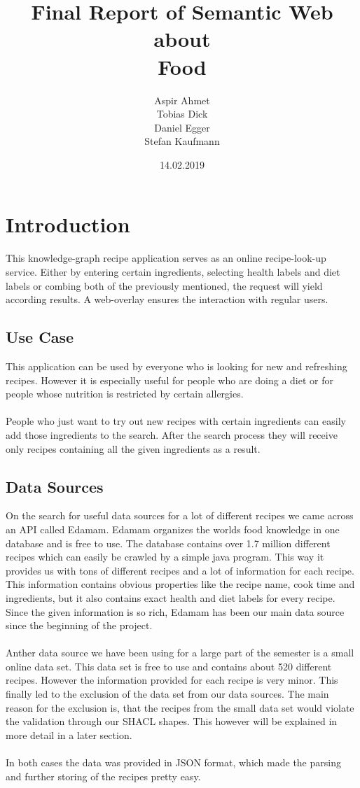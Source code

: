 \documentclass{article}
\title{ Final Report of Semantic Web about \\ \Huge \textbf{Food}}
\author{Aspir Ahmet \\ Tobias Dick \\ Daniel Egger \\Stefan Kaufmann}
\date{14.02.2019}
\begin{document}
\thispagestyle{empty}
\clearpage
\maketitle
\thispagestyle{empty}
\thispagestyle{empty}
\newpage
\clearpage
\tableofcontents 
\thispagestyle{empty}
\newpage
\pagebreak
{}
	
\section{Introduction}
This knowledge-graph recipe application serves as an online recipe-look-up service. Either by entering certain ingredients, selecting health labels and diet labels or combing both of the previously mentioned, the request will yield according results. A web-overlay ensures the interaction with regular users. 
\subsection{Use Case}
This application can be used by everyone who is looking for new and refreshing recipes. However it is especially useful for people who are doing a diet or for people whose nutrition is restricted by certain allergies. \\ \\
People who just want to try out new recipes with certain ingredients can easily add those ingredients to the search. After the search process they will receive only recipes containing all the given ingredients as a result.

\subsection{Data Sources}
On the search for useful data sources for a lot of different recipes we came across an API called Edamam. Edamam organizes the worlds food knowledge in one database and is free to use. The database contains over 1.7 million different recipes which can easily be crawled by a simple java program. This way it provides us with tons of different recipes and a lot of information for each recipe. This information contains obvious properties like the recipe name, cook time and ingredients, but it also contains exact health and diet labels for every recipe. Since the given information is so rich, Edamam has been our main data source since the beginning of the project. \\ \\
Anther data source we have been using for a large part of the semester is a small online data set. This data set is free to use and contains about 520 different recipes. However the information provided for each recipe is very minor. This finally led to the exclusion of the data set from our data sources. The main reason for the exclusion is, that the recipes from the small data set would violate the validation through our SHACL shapes. This however will be explained in more detail in a later section.\\ \\
In both cases the data was provided in JSON format, which made the parsing and further storing of the recipes pretty easy.
\end{document}
